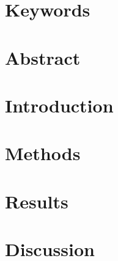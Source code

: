 
\section*{Keywords}

\section*{Abstract}

\section{Introduction}

\section{Methods}

\section{Results}

\section{Discussion}
